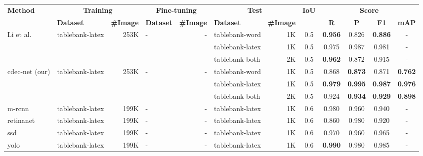 \documentclass[a4paper,conference]{IEEEtran}
\begin{document}
\begin{table*}[ht!]
\addtolength{\tabcolsep}{-2.0pt}
\begin{center}
\begin{tabular}{|l| l | r|l |r|l|r| c| c c c c|} \hline
\textbf{Method} &\multicolumn{2}{|c|}{\textbf{Training}} &\multicolumn{2}{|c|}{\textbf{Fine-tuning}} &\multicolumn{2}{|c|}{\textbf{Test}} &\textbf{IoU} & \multicolumn{4}{|c|}{\textbf{Score}} \\ \cline{2-7} \cline{9-12}
  &\textbf{Dataset} &\textbf{\#Image} &\textbf{Dataset} &\textbf{\#Image} &\textbf{Dataset} &\textbf{\#Image} &  &\textbf{R} &\textbf{P} &\textbf{F1} &\textbf{mAP} \\ \hline  
Li et al.~\cite{li2019tablebank} &{\sc t}able{\sc b}ank-{\sc l}a{\sc t}e{\sc x} &253K &- &- &{\sc t}able{\sc b}ank-{\sc w}ord &1K &0.5 & \textbf{0.956} &0.826 & \textbf{0.886} &- \\ 
 & & & & &{\sc t}able{\sc b}ank-{\sc l}a{\sc t}e{\sc x} &1K &0.5 &0.975 &0.987 &0.981 &- \\
 & & & & &{\sc t}able{\sc b}ank-both &2K &0.5 & \textbf{0.962} &0.872 &0.915 &- \\ \hline
{\sc cd}e{\sc c-n}et (our) &{\sc t}able{\sc b}ank-{\sc l}a{\sc t}e{\sc x} &253K &- &- &{\sc t}able{\sc b}ank-{\sc w}ord &1K &0.5 & 0.868 & \textbf{0.873} & 0.871 & \textbf{0.762} \\  
& & & & &{\sc t}able{\sc b}ank-{\sc l}a{\sc t}e{\sc x} &1K &0.5 & \textbf{0.979} & \textbf{0.995} & \textbf{0.987} & \textbf{0.976} \\
 & & & & &{\sc t}able{\sc b}ank-both &2K &0.5 & 0.924 & \textbf{0.934} & \textbf{0.929} & \textbf{0.898} \\ \hhline{|=|=|=|=|=|=|=|=|====|}
{\sc m-rcnn}~\cite{casado2019benefits} &{\sc t}able{\sc b}ank-{\sc l}a{\sc t}e{\sc x} &199K &- &- &{\sc t}able{\sc b}ank-{\sc l}a{\sc t}e{\sc x} &1K &0.6 &0.980 &0.960 &0.940 &- \\   
{\sc r}etina{\sc n}et~\cite{casado2019benefits} &{\sc t}able{\sc b}ank-{\sc l}a{\sc t}e{\sc x} &199K &- &- &{\sc t}able{\sc b}ank-{\sc l}a{\sc t}e{\sc x} &1K &0.6 &0.860 &0.980 &0.920 &- \\   
{\sc ssd}~\cite{casado2019benefits} &{\sc t}able{\sc b}ank-{\sc l}a{\sc t}e{\sc x} &199K &- &- &{\sc t}able{\sc b}ank-{\sc l}a{\sc t}e{\sc x} &1K &0.6 &0.970 &0.960 &0.965 &- \\ 
{\sc yolo}~\cite{casado2019benefits}  &{\sc t}able{\sc b}ank-{\sc l}a{\sc t}e{\sc x} &199K &- &- &{\sc t}able{\sc b}ank-{\sc l}a{\sc t}e{\sc x} &1K &0.6 & \textbf{0.990} &0.980 &0.985 &-\\ 

\end{tabular}
\end{center}
\end{table*}
\end{document}
